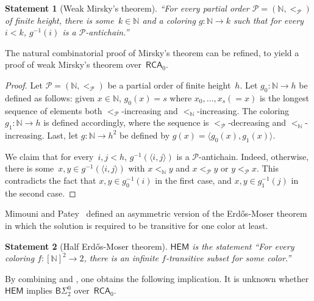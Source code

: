 \documentclass{article}
\def\P{\mathcal{P}}
\newcommand{\BSig}{\mathsf{B}\Sigma^0}
\newcommand{\RCA}[0]{\mathsf{RCA}}
\newcommand{\HEM}[0]{\mathsf{HEM}}
\newcommand{\BRT}[0]{\mathsf{BRT}}
\newcommand{\NN}[0]{\mathbb{N}}
\def\qt#1{``#1''}%
\newtheorem*{statement}{Statement}
\numberwithin{theorem}{section}
\newtheorem{proposition}[theorem]{Proposition}
\begin{document}
\begin{statement}[Weak Mirsky's theorem]
\qt{For every partial order $\P = (\NN, <_\P)$ of finite height, there is some~$k \in \NN$ and a coloring $g : \NN \to k$ such that for every~$i < k$, $g^{-1}(i)$ is a $\P$-antichain.}
\end{statement}

The natural combinatorial proof of Mirsky's theorem can be refined, to yield a proof of weak Mirsky's theorem over~$\RCA_0$.

\begin{proof}
Let $\P = (\NN, <_\P)$ be a partial order of finite height~$h$.
Let $g_0 : \NN \to h$ be defined as follows: 
given $x \in \NN$, $g_0(x) = s$ where $x_0, \dots, x_s (=x)$ is the longest sequence of elements both $<_\P$-increasing and $<_\NN$-increasing.
The coloring $g_1 : \NN \to h$ is defined accordingly, where the sequence is $<_\P$-decreasing and $<_\NN$-increasing.
Last, let $g : \NN \to h^2$ be defined by $g(x) = \langle g_0(x), g_1(x) \rangle$.

We claim that for every~$i, j < h$, $g^{-1}(\langle i,  j \rangle)$ is a $\P$-antichain.
Indeed, otherwise, there is some~$x, y \in g^{-1}(\langle i,  j \rangle)$ with $x <_\NN y$ and $x <_\P y$ or $y <_\P x$. This contradicts the fact that $x, y \in g^{-1}_0(i)$ in the first case, and $x, y \in g^{-1}_1(j)$ in the second case.
\end{proof}

Mimouni and Patey~\cite{mimouni2025ramseylike} defined an asymmetric version of the Erd\H{o}s-Moser theorem in which the solution is required to be transitive for one color at least.

\begin{statement}[Half Erd\H{o}s-Moser theorem]
$\HEM$ is the statement \qt{For every coloring $f : [\NN]^2 \to 2$, there is an infinite $f$-transitive subset for some color.}
\end{statement}

By combining  and , one obtains the following implication. It is unknown whether $\HEM$ implies $\BSig_2$ over~$\RCA_0$.
\end{document}
